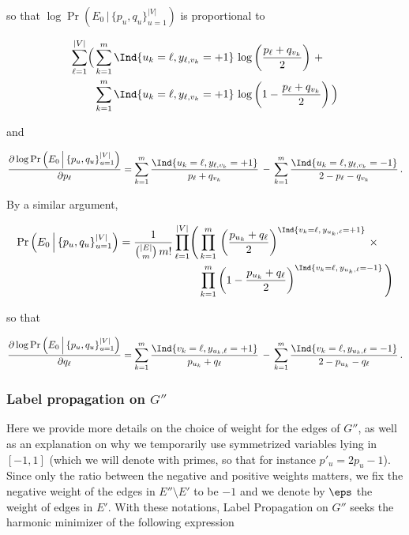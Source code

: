so that $\log \Pr\left(E_0\,\Big|\, \{p_u, q_u\}_{u=1}^{|V|}\right)$ is proportional to

\begin{align*}
  \sum_{\ell=1}^{|V|}\Bigl(&\sum_{k=1}^m \Ind{u_k = \ell,y_{\ell,v_k}=+1}\,
  \log\left(\frac{p_{\ell}+q_{v_k}}{2} \right)\, +\\
  &\sum_{k=1}^m \Ind{u_k = \ell,y_{\ell,v_k}=+1}\, 
\log\left(1-\frac{p_{\ell}+q_{v_k}}{2} \right)\Bigl)
\end{align*}

and

\begin{equation*}
  \frac{\partial \log \Pr\left(E_0\,\Big|\, \{p_u, q_u\}_{u=1}^{|V|}\right)}{\partial p_{\ell}}
  = \sum_{k=1}^m 
  \frac{\Ind{u_k = \ell,y_{\ell,v_k}=+1}}{p_{\ell}+q_{v_k}}\,
   - \,
  \sum_{k=1}^m \frac{\Ind{u_k = \ell,y_{\ell,v_k}=-1}}{2-p_{\ell}-q_{v_k}}\,.
\end{equation*}

By a similar argument,

\begin{align*}
  \Pr\left(E_0\,\Big|\, \{p_u, q_u\}_{u=1}^{|V|}\right) 
=
  \frac{1}{\binom{|E|}{m}\,m!}
  \prod_{\ell=1}^{|V|}\Biggl(&\prod_{k=1}^m\,
    \left(\frac{p_{u_k}+q_{\ell}}{2} \right)^{\Ind{v_k = \ell,\,y_{u_k,\ell}=+1}}\,
\times\\
&\prod_{k=1}^m\left(1-\frac{p_{u_k}+q_{\ell}}{2} \right)^{\Ind{v_k = \ell,\,y_{u_k,\ell}=-1}}\Biggl)
\end{align*}

so that

\begin{align*}
\frac{\partial \log \Pr\left(E_0\,\Big|\, \{p_u, q_u\}_{u=1}^{|V|}\right)}{\partial q_{\ell}}
= \sum_{k=1}^m \frac{\Ind{v_k = \ell,y_{u_k,\ell}=+1}}{p_{u_k}+q_{\ell}}\,
- \, \sum_{k=1}^m \frac{\Ind{v_k = \ell,y_{u_k,\ell}=-1}}{2-p_{u_k}-q_{\ell}}\,.
\end{align*}

\subsubsection{Label propagation on $G''$}
\label{ssec:troll_lprop_weights}

Here we provide more details on the choice of weight for the edges of $G''$, as well as an
explanation on why we temporarily use symmetrized variables lying in $[-1, 1]$ (which we will denote
with primes, so that for instance $p'_u = 2p_u-1$). Since only the ratio between the negative and
positive weights matters, we fix the negative weight of the edges in $E''\setminus E'$ to be $-1$
and we denote by $\eps$ the weight of edges in $E'$.  With these notations, Label Propagation on
$G''$ seeks the harmonic minimizer of the following expression 

